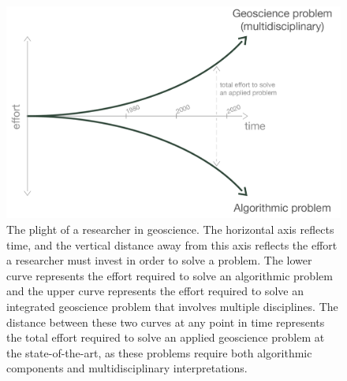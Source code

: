 \begin{figure}
    \begin{center}
    \includegraphics[width=0.8\columnwidth]{figures/diverging-curves-08.png}
    \end{center}
\caption{
    The plight of a researcher in geoscience. The horizontal axis reflects time, and
    the vertical distance away from this axis reflects the effort a researcher must
    invest in order to solve a problem. The lower curve represents the effort required
    to solve an algorithmic problem and the upper curve represents the effort required
    to solve an integrated geoscience problem that involves multiple disciplines.
    The distance between these two curves at any point in time represents the total
    effort required to solve an applied geoscience problem at the state-of-the-art,
    as these problems require both algorithmic components and multidisciplinary
    interpretations.
}
\label{fig:diverging-curves}
\end{figure}
